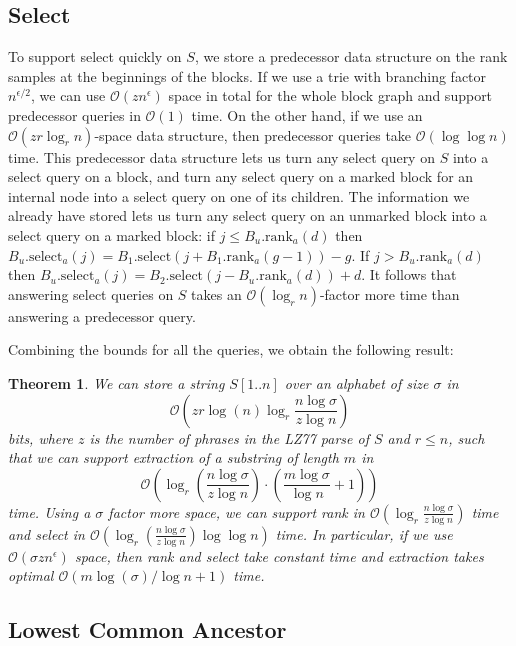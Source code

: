 \documentclass[12pt]{article}
\newcommand{\Oh}[1]
  {\ensuremath{\mathcal{O}\!\left({#1}\right)}}
\newcommand{\rank}
  {\ensuremath{\mathrm{rank}}}
\newcommand{\select}
  {\ensuremath{\mathrm{select}}}
\newtheorem{thrm}[obs]{Theorem}
\begin{document}
\subsection{Select}
\label{subsec:select}

To support select quickly on $S$, we store a predecessor data structure on the rank samples at the beginnings of the blocks.  If we use a trie with branching factor $n^{\epsilon / 2}$, we can use $\Oh{z n^\epsilon}$ space in total for the whole block graph and support predecessor queries in $\Oh{1}$ time.  On the other hand, if we use an $\Oh{z r \log_r n}$-space data structure, then predecessor queries take $\Oh{\log \log n}$ time.  This predecessor data structure lets us turn any select query on $S$ into a select query on a block, and turn any select query on a marked block for an internal node into a select query on one of its children.  The information we already have stored lets us turn any select query on an unmarked block into a select query on a marked block: if \(j \leq B_u.\rank_a (d)\) then \(B_u.\select_a (j) = B_1.\select (j + B_1.\rank_a (g - 1)) - g\).  If \(j > B_u.\rank_a (d)\) then \(B_u.\select_a (j) = B_2.\select (j - B_u.\rank_a (d)) + d\).  It follows that answering select queries on $S$ takes an $\Oh{\log_r n}$-factor more time than answering a predecessor query.

Combining the bounds for all the queries, we obtain the following result:

\begin{thrm}
\label{thm:main}
We can store a string \(S [1..n]\) over an alphabet of size $\sigma$ in
\[\Oh{zr \log (n) \log_r \frac{n\log\sigma}{z\log n}}\]
bits, where $z$ is the number of phrases in the LZ77 parse of $S$ and \(r \leq n\), such that we can support extraction of a substring of length $m$ in
\[\Oh{\log_r \left( \frac{n\log\sigma}{z\log n} \right) \cdot \left( \frac{m \log \sigma}{\log n} +1 \right)}\]
time.  Using a $\sigma$ factor more space, we can support rank in $\Oh{\log_r \frac{n\log\sigma}{z\log n}}$ time and select in $\Oh{\log_r \left( \frac{n\log\sigma}{z\log n} \right) \log \log n}$ time.  In particular, if we use $\Oh{\sigma z n^\epsilon}$ space, then rank and select take constant time and extraction takes optimal $\Oh{m \log (\sigma) / \log n + 1}$ time.
\end{thrm}

\subsection{Lowest Common Ancestor}
\label{subsec:lca}
\end{document}
